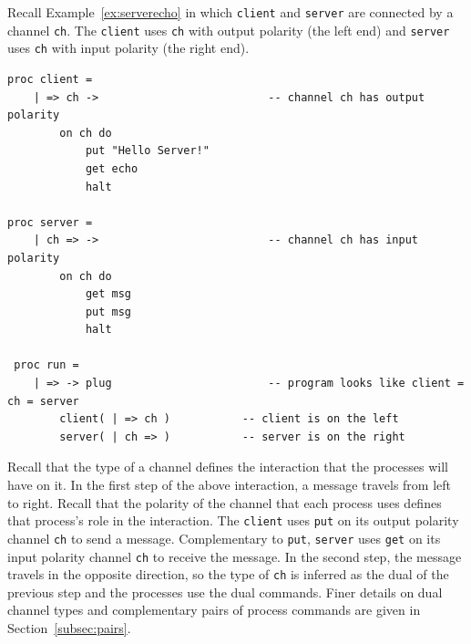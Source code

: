 \documentclass[11pt]{article}
\begin{document}
Recall Example~\ref{ex:serverecho} in which \lstinline$client$ and \lstinline$server$ are connected by a channel \lstinline$ch$. The \lstinline$client$ uses \lstinline$ch$ with output polarity (the left end) and \lstinline$server$ uses \lstinline$ch$ with input polarity (the right end).
\begin{lstlisting}[label=ex:serverechofull, caption=Server echos Client's message]
proc client = 
	| => ch ->							-- channel ch has output polarity
		on ch do 
			put "Hello Server!" 
			get echo				
			halt

proc server =  
	| ch => ->							-- channel ch has input polarity
		on ch do
			get msg						
			put msg						
			halt
			
 proc run = 
 	| => -> plug						-- program looks like client = ch = server
 		client( | => ch )			-- client is on the left
 		server( | ch => )			-- server is on the right
\end{lstlisting}
Recall that the type of a channel defines the interaction that the processes will have on it.
In the first step of the above interaction, a message travels from left to right.
Recall that the polarity of the channel that each process uses defines that process's role in the interaction.
The \lstinline$client$ uses \lstinline$put$ on its output polarity channel \lstinline$ch$ to send a message. Complementary to \lstinline$put$, \lstinline$server$ uses \lstinline$get$ on its input polarity channel \lstinline$ch$ to receive the message.
In the second step, the message travels in the opposite direction, so the type of \lstinline$ch$ is inferred as the dual of the previous step and the processes use the dual commands.
Finer details on dual channel types and complementary pairs of process commands are given in Section~\ref{subsec:pairs}.
\end{document}
